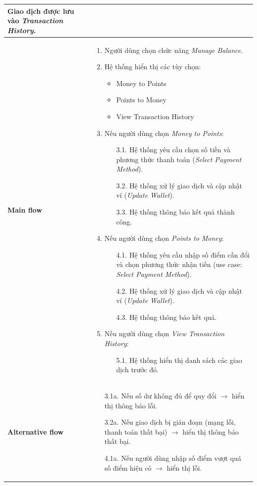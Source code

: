 \documentclass{article}
\begin{document}
\begin{table}[h!]
\begin{tabular}{p{3cm} p{11cm}}
    Giao dịch được lưu vào \textit{Transaction History}. \\
\hline
\vspace{0.025cm}
\textbf{Main flow} & 
\begin{enumerate}
    \item Người dùng chọn chức năng \textit{Manage Balance}.
    \item Hệ thống hiển thị các tùy chọn:
    \begin{itemize}
        \item Money to Points
        \item Points to Money
        \item View Transaction History
    \end{itemize}
    \item Nếu người dùng chọn \textit{Money to Points}:
    \begin{itemize}
        \item[3.1.] Hệ thống yêu cầu chọn số tiền và phương thức thanh toán (\textit{Select Payment Method}).
        \item[3.2.] Hệ thống xử lý giao dịch và cập nhật ví (\textit{Update Wallet}).
        \item[3.3.] Hệ thống thông báo kết quả thành công.
    \end{itemize}
    \item Nếu người dùng chọn \textit{Points to Money}:
    \begin{itemize}
        \item[4.1.] Hệ thống yêu cầu nhập số điểm cần đổi và chọn phương thức nhận tiền (use case: \textit{Select Payment Method}).
        \item[4.2.] Hệ thống xử lý giao dịch và cập nhật ví (\textit{Update Wallet}).
        \item[4.3.] Hệ thống thông báo kết quả.
    \end{itemize}
    \item Nếu người dùng chọn \textit{View Transaction History}:
    \begin{itemize}
        \item[5.1.] Hệ thống hiển thị danh sách các giao dịch trước đó.
    \end{itemize}
\end{enumerate} \\
\hline
\vspace{0.025cm}
\textbf{Alternative flow} &
\begin{itemize}
    \item[3.1a.] Nếu số dư không đủ để quy đổi $\rightarrow$ hiển thị thông báo lỗi.
    \item[3.2a.] Nếu giao dịch bị gián đoạn (mạng lỗi, thanh toán thất bại) $\rightarrow$ hiển thị thông báo thất bại.
    \item[4.1a.] Nếu người dùng nhập số điểm vượt quá số điểm hiện có $\rightarrow$ hiển thị lỗi.
\end{itemize} \\
\hline
\end{tabular}


\end{table}
\end{document}
